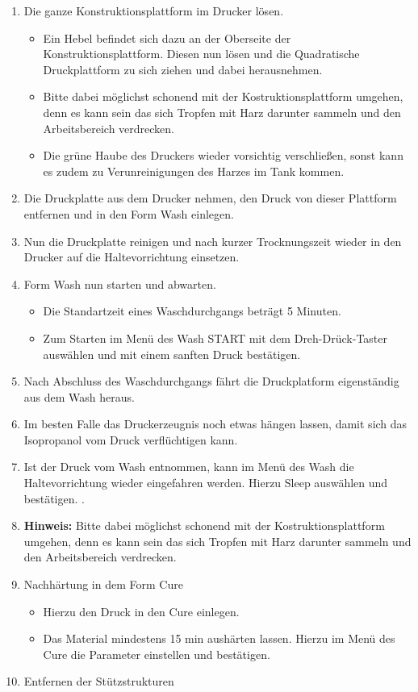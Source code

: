 \documentclass{\basedir/fablab-document}
\begin{document}
\begin{enumerate}
    \item Die ganze Konstruktionsplattform im Drucker lösen.
        \begin{itemize}
            \item Ein Hebel befindet sich dazu an der Oberseite der Konstruktionsplattform. Diesen nun lösen und die Quadratische Druckplattform zu sich ziehen und dabei herausnehmen.
	    \item Bitte dabei möglichst schonend mit der Kostruktionsplattform umgehen, denn es kann sein das sich Tropfen mit Harz darunter sammeln und den Arbeitsbereich verdrecken.
            \item Die grüne Haube des Druckers wieder vorsichtig verschließen, sonst kann es zudem zu Verunreinigungen des Harzes im Tank kommen.
        \end{itemize}
    \item Die Druckplatte aus dem Drucker nehmen, den Druck von dieser Plattform entfernen und in den Form Wash einlegen.
    \item Nun die Druckplatte reinigen und nach kurzer Trocknungszeit wieder in den Drucker auf die Haltevorrichtung einsetzen. 
    \item Form Wash nun starten und abwarten.
    \begin{itemize}
    	\item Die Standartzeit eines Waschdurchgangs beträgt 5 Minuten.
    	\item Zum Starten im Menü des Wash START mit dem Dreh-Drück-Taster auswählen und mit einem sanften Druck bestätigen.
    \end{itemize}
        	\item Nach Abschluss des Waschdurchgangs fährt die Druckplatform eigenständig aus dem Wash heraus.
        	\item Im besten Falle das Druckerzeugnis noch etwas hängen lassen, damit sich das Isopropanol vom Druck verflüchtigen kann.
        	\item Ist der Druck vom Wash entnommen, kann im Menü des Wash die Haltevorrichtung wieder eingefahren werden. Hierzu Sleep auswählen und bestätigen. .
            \item \textbf{Hinweis:} Bitte dabei möglichst schonend mit der Kostruktionsplattform umgehen, denn es kann sein das sich Tropfen mit Harz darunter sammeln und den Arbeitsbereich verdrecken.
    \item Nachhärtung in dem Form Cure
        \begin{itemize}
            \item Hierzu den Druck in den Cure einlegen.
            \item Das Material mindestens 15 min aushärten lassen. Hierzu im Menü des Cure die Parameter einstellen und bestätigen.
        \end{itemize}

    \item Entfernen der Stützstrukturen

\end{enumerate}
\end{document}
